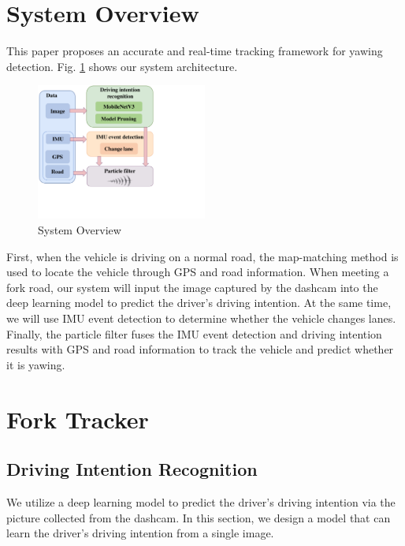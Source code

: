 \documentclass[journal]{IEEEtran}
\begin{document}
\section{System Overview}\label{sec:overview}
This paper proposes an accurate and real-time tracking framework for yawing detection.
Fig. \ref{fig:SystemOverview} shows our system architecture.

\begin{figure}[htbp]
    \centerline{\includegraphics[width=0.5\textwidth]{fig/SystemOverview1.pdf}}
    \caption{System Overview}
    \label{fig:SystemOverview}
\end{figure}

First, when the vehicle is driving on a normal road, the map-matching method is used to locate the vehicle through GPS and road information. When meeting a fork road, our system will input the image captured by the dashcam into the deep learning model to predict the driver's driving intention. At the same time, we will use IMU event detection to determine whether the vehicle changes lanes. Finally, the particle filter fuses the IMU event detection and driving intention results with GPS and road information to track the vehicle and predict whether it is yawing.

\section{Fork Tracker}
\subsection{Driving Intention Recognition}\label{sec:image}
We utilize a deep learning model to predict the driver's driving intention via the picture collected from the dashcam.
In this section, we design a model that can learn the driver's driving intention from a single image.
\end{document}
